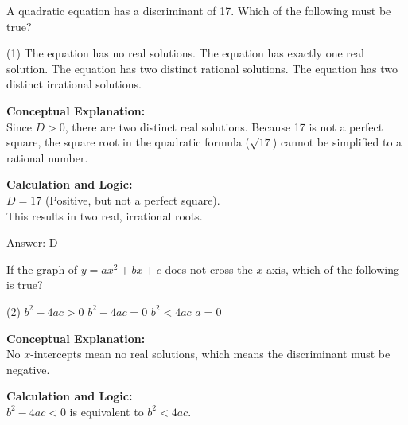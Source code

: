 \documentclass[11pt,paper=a4,answers]{exam}
\begin{document}
\begin{questions}
\question
A quadratic equation has a discriminant of 17. Which of the following must be true?
\begin{tasks}(1)
    \task The equation has no real solutions.
    \task The equation has exactly one real solution.
    \task The equation has two distinct rational solutions.
    \task The equation has two distinct irrational solutions.
\end{tasks}

\begin{solution}
\textbf{Conceptual Explanation:} \\
Since $D > 0$, there are two distinct real solutions. Because 17 is not a perfect square, the square root in the quadratic formula ($\sqrt{17}$) cannot be simplified to a rational number.

\vspace{20pt}

\textbf{Calculation and Logic:} \\
$D = 17$ (Positive, but not a perfect square). \\
This results in two real, irrational roots.

\vspace{25pt}

Answer: \colorbox{yellow!100}{D}
\end{solution}

\vspace{40pt}

\question
If the graph of $y = ax^2 + bx + c$ does not cross the $x$-axis, which of the following is true?
\begin{tasks}(2)
    \task $b^2 - 4ac > 0$
    \task $b^2 - 4ac = 0$
    \task $b^2 < 4ac$
    \task $a = 0$
\end{tasks}

\begin{solution}
\textbf{Conceptual Explanation:} \\
No $x$-intercepts mean no real solutions, which means the discriminant must be negative.

\vspace{20pt}

\textbf{Calculation and Logic:} \\
$b^2 - 4ac < 0$ is equivalent to $b^2 < 4ac$.

\vspace{25pt}


\end{solution}
\end{questions}
\end{document}
